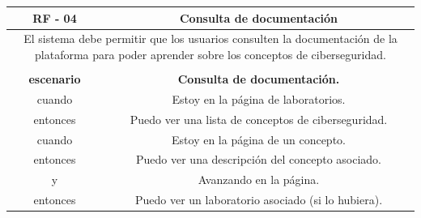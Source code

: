         \begin{table}[!htbp]
            \centering

            \begin{tabular}{|c|c|}
                \hline
                \textbf{RF - 04} & \textbf{Consulta de documentación} \\
                \hline
                \multicolumn{2}{|p{15cm}|}{
                    El sistema debe permitir que los usuarios consulten la documentación de la plataforma para poder aprender sobre los conceptos de ciberseguridad.
                } \\                    
                \hline
                \multicolumn{2}{|p{15cm}|}{
                } \\
                \hline
                \textbf{escenario} & \textbf{Consulta de documentación.} \\
                cuando & Estoy en la página de laboratorios. \\
                entonces & Puedo ver una lista de conceptos de ciberseguridad. \\
                cuando & Estoy en la página de un concepto. \\
                entonces & Puedo ver una descripción del concepto asociado. \\
                y & Avanzando en la página. \\
                entonces & Puedo ver un laboratorio asociado (si lo hubiera). \\
                \hline
            \end{tabular}
        \end{table}

